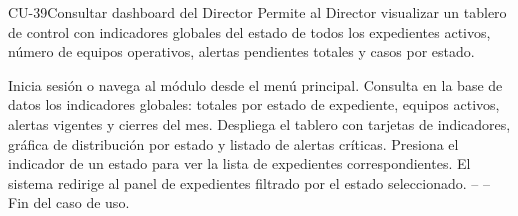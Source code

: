 \begin{UseCase}{CU-39}{Consultar dashboard del Director}{
	Permite al Director visualizar un tablero de control con indicadores globales del estado de todos los expedientes activos, número de equipos operativos, alertas pendientes totales y casos por estado.
}
\end{UseCase}

\begin{UCtrayectoria}
	\UCpaso[\UCactor] Inicia sesión o navega al módulo  desde el menú principal.
	\UCpaso Consulta en la base de datos los indicadores globales: totales por estado de expediente, equipos activos, alertas vigentes y cierres del mes.
	\UCpaso Despliega el tablero con tarjetas de indicadores, gráfica de distribución por estado y listado de alertas críticas.
	\UCpaso[\UCactor] Presiona el indicador de un estado para ver la lista de expedientes correspondientes.
	\UCpaso El sistema redirige al panel de expedientes filtrado por el estado seleccionado.
	\UCpaso[] -- -- Fin del caso de uso.
\end{UCtrayectoria}

